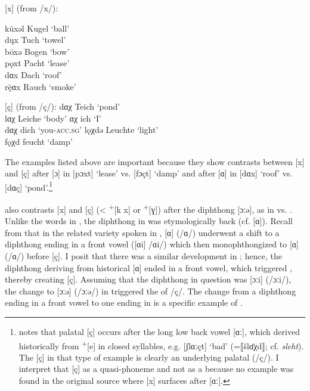 \ea%
\label{ex:9:17} [x] (from /x/):\\
\begin{xlist}
\sn
kūxəl    \tab [kuːxəl] \tab Kugel \tab ‘ball’  \\
d\k{u}x  \tab [dʊx]    \tab Tuch  \tab ‘towel’ \\
bōxə     \tab [boːxə]  \tab Bogen \tab ‘bow’   \\
pǫxt     \tab [pɔxt]   \tab Pacht \tab ‘lease’ \\
dɑx      \tab [dɑx]    \tab Dach  \tab ‘roof’  \\
r\={ę}ɑx \tab [rɛːɑx]  \tab Rauch \tab ‘smoke’ \\
\end{xlist}
\ex %
\label{ex:9:18} [ç] (from /ç/):
\ea\label{ex:9:18a} dɑχ   \tab  [dɑç]   \tab Teich   \tab ‘pond’ \\
    lɑχ   \tab  [lɑç]   \tab Leiche  \tab ‘body’ 
\ex\label{ex:9:18b} ɑχ    \tab  [ɑç]    \tab ich     \tab ‘I’    \\
    dɑχ   \tab  [dɑç]   \tab dich    \tab ‘you-\textsc{acc}.\textsc{sg}’ 
\ex\label{ex:9:18c} lǫχdə \tab  [lɔçtə] \tab Leuchte \tab ‘light’                        \\
    fǫχd  \tab  [fɔçt]  \tab feucht  \tab ‘damp’                         
   \z
\z 

The examples listed above are important because they show contrasts between [x] and [ç] after [ɔ] in [pɔxt] ‘lease’ vs. [fɔçt] ‘damp’ and after [ɑ] in [dɑx] ‘roof’ vs. [dɑç] ‘pond’.\footnote{\citet[63--64]{Friebertshäuser1961} notes that palatal [ç] occurs after the long low back vowel [ɑː], which derived historically from  \textsuperscript{+}[e] in closed syllables, e.g. [ʃlɑːçt] ‘bad’ (=⟦šlɑ̄χd⟧; cf.  \textit{sleht}). The [ç] in that type of example is clearly an underlying palatal (/ç/). I interpret that [ç] as a quasi-phoneme and not as a  because no example was found in the original source where [x] surfaces after [ɑː].}

 also contrasts [x] and [ç] (<  \textsuperscript{+}[k x] or  \textsuperscript{+}[ɣ]) after the diphthong [ɔːə], as in  vs. . Unlike the words in , the diphthong in  was etymologically back (cf.  [ɑ]). Recall from  that in the related variety spoken in ,  [ɑ] (/ɑ/) underwent a shift to a diphthong ending in a front vowel ([ɑi] /ɑi/) which then monophthongized to [ɑ] (/ɑ/) before [ç]. I posit that there was a similar development in ; hence, the diphthong deriving from historical [ɑ] ended in a front vowel, which triggered , thereby creating [ç]. Assuming that the diphthong in question was [ɔːi] (/ɔːi/), the change to [ɔːə] (/ɔːə/) in  triggered the  of /ç/. The change from a diphthong ending in a front vowel to one ending in  is a specific example of .

